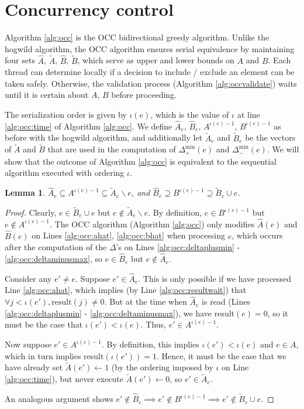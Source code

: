 \documentclass{article} %
\newtheorem{lem}[thm]{Lemma}
\begin{document}
\section{Concurrency control}

Algorithm \ref{alg:occ} is the OCC bidirectional greedy algorithm.
Unlike the hogwild algorithm, the OCC algorithm ensures serial equivalence by maintaining four sets $\hat{A}$, $\tilde{A}$, $\hat{B}$, $\tilde{B}$, which serve as upper and lower bounds on $A$ and $B$.
Each thread can determine locally if a decision to include / exclude an element can be taken safely.
Otherwise, the validation process (Algorithm \ref{alg:occvalidate}) waits until it is certain about $A$, $B$ before proceeding.

The serialization order is given by $\iota(e)$, which is the value of $\iota$ at line \ref{alg:occ:time} of Algorithm \ref{alg:occ}.
We define $\hat{A}_e$, $\hat{B}_e$, $A^{\iota(e)-1}$, $B^{\iota(e)-1}$ as before with the hogwild algorithm, and additionally let $\tilde{A}_e$ and $\tilde{B}_e$ be the vectors of $\tilde{A}$ and $\tilde{B}$ that are used in the computation of $\Delta_+^{\min}(e)$ and $\Delta_-^{\min}(e)$.
We will show that the outcome of Algorithm \ref{alg:occ} is equivalent to the sequential algorithm executed with ordering $\iota$.

\begin{lem} $\hat{A}_e \subseteq A^{\iota(e)-1} \subseteq \tilde{A}_e \backslash e$, and $\hat{B}_e \supseteq B^{\iota(e)-1} \supseteq \tilde{B}_e \cup e$.
\end{lem}
\begin{proof}
Clearly, $e \in \tilde{B}_e\cup e$ but $e\not\in \tilde{A}_e\backslash e$.
By definition, $e \in B^{\iota(e)-1}$ but $e\not\in A^{\iota(e)-1}$.
The OCC algorithm (Algorithm \ref{alg:occ}) only modifies $\hat{A}(e)$ and $\hat{B}(e)$ on Lines \ref{alg:occ:ahat}, \ref{alg:occ:bhat} when processing $e$, which occurs after the computation of the $\Delta$'s on Lines \ref{alg:occ:deltaplusmin} - \ref{alg:occ:deltaminusmax}, so $e \in \hat{B}_e$ but $e\not\in \hat{A}_e$.

Consider any $e'\neq e$.
Suppose $e' \in \hat{A}_e$.
This is only possible if we have processed Line \ref{alg:occ:ahat}, which implies (by Line \ref{alg:occ:resultwait}) that $\forall j < \iota(e'), \text{result}(j) \neq 0$.
But at the time when $\hat{A}_e$ is read (Lines \ref{alg:occ:deltaplusmin} - \ref{alg:occ:deltaminusmax}), we have result$(e)=0$, so it must be the case that $\iota(e') < \iota(e)$.
Thus, $e' \in A^{\iota(e)-1}$.

Now suppose $e' \in A^{\iota(e)-1}$.
By definition, this implies $\iota(e') < \iota(e)$ and $e \in A$, which in turn implies result$(\iota(e'))=1$.
Hence, it must be the case that we have already set $\tilde{A}(e') \leftarrow 1$ (by the ordering imposed by $\iota$ on Line \ref{alg:occ:time}), but never execute $\tilde{A}(e') \leftarrow 0$, so $e' \in \tilde{A}_e$.

An analogous argument shows $e' \not\in \hat{B}_e \implies e' \not\in B^{\iota(e)-1} \implies e' \not\in\tilde{B}_e \cup e$.
\end{proof}
\end{document}
